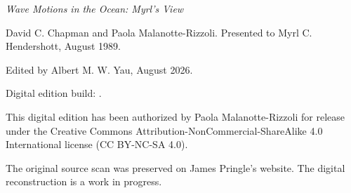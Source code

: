 \thispagestyle{empty}
\vspace*{2.25in}
{\footnotesize
	\noindent\textit{Wave Motions in the Ocean: Myrl's View}\par
	\noindent David C. Chapman and Paola Malanotte-Rizzoli. Presented to
	Myrl C. Hendershott, August 1989.\par
	\medskip
	\noindent Edited by Albert M. W. Yau, August 2026.\par
	\smallskip
	\noindent Digital edition build:
	\href{\wavebuildurl}{\texttt{\wavebuildlabel}}.\par
	\medskip
	\noindent This digital edition has been authorized by Paola Malanotte-Rizzoli
	for release under the Creative Commons Attribution-NonCommercial-ShareAlike
	4.0 International license (CC BY-NC-SA 4.0).\par
	\medskip
	\noindent The original source scan was preserved on James Pringle's website.
	The digital reconstruction is a work in progress.\par
}
\wavecovercredit
\clearpage

\WaveModernOriginalTableOfContents
\clearpage

\RenewDocumentCommand{\tableofcontents}{}{}
